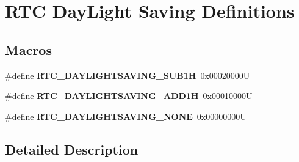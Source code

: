 \hypertarget{group___r_t_c___day_light_saving___definitions}{}\section{R\+TC Day\+Light Saving Definitions}
\label{group___r_t_c___day_light_saving___definitions}
\subsection*{Macros}
\begin{DoxyCompactItemize}
\item 
\mbox{\label{group___r_t_c___day_light_saving___definitions_ga7ccaea4cb9cb5fbd21b97dce1e2e887d}} 
\#define {\bfseries R\+T\+C\+\_\+\+D\+A\+Y\+L\+I\+G\+H\+T\+S\+A\+V\+I\+N\+G\+\_\+\+S\+U\+B1H}~0x00020000U
\item 
\mbox{\label{group___r_t_c___day_light_saving___definitions_gabd374c3ce0fb1b3ec96a3a71155151ae}} 
\#define {\bfseries R\+T\+C\+\_\+\+D\+A\+Y\+L\+I\+G\+H\+T\+S\+A\+V\+I\+N\+G\+\_\+\+A\+D\+D1H}~0x00010000U
\item 
\mbox{\label{group___r_t_c___day_light_saving___definitions_gafef31f6f6d924dededc4589d2dd16a5c}} 
\#define {\bfseries R\+T\+C\+\_\+\+D\+A\+Y\+L\+I\+G\+H\+T\+S\+A\+V\+I\+N\+G\+\_\+\+N\+O\+NE}~0x00000000U
\end{DoxyCompactItemize}


\subsection{Detailed Description}

